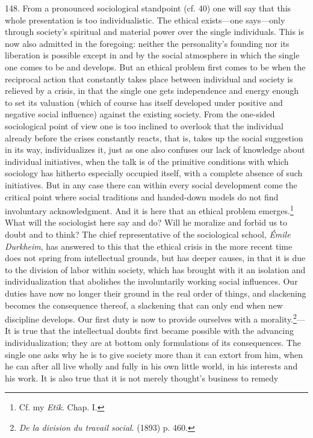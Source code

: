 \documentclass[12pt,a4paper]{book}
\newcommand{\opage}[1]{\marginnote{\footnotesize\textit{[#1]}}}
\begin{document}
148. From a pronounced sociological standpoint (cf. 40) one will say that this whole presentation is too
individualistic. The ethical exists---one says---only through society's spiritual and material power over
the single individuals. This is now also admitted in the foregoing: neither the \opage{354}personality's founding nor
its liberation is possible except in and by the social atmosphere in which the single one comes to be and
develops. But an ethical problem first comes to be when the reciprocal action that constantly takes place
between individual and society is relieved by a crisis, in that the single one gets independence and energy
enough to set its valuation (which of course has itself developed under positive and negative social
influence) against the existing society. From the one-sided sociological point of view one is too inclined
to overlook that the individual already before the crises constantly reacts, that is, takes up the social
suggestion in its way, individualizes it, just as one also confuses our lack of knowledge about individual
initiatives, when the talk is of the primitive conditions with which sociology has hitherto especially
occupied itself, with a complete absence of such initiatives. But in any case there can within every social
development come the critical point where social traditions and handed-down models do not find involuntary
acknowledgment. And it is here that an ethical problem emerges.\footnote{Cf. my \emph{Etik}. Chap. I.} What
will the sociologist here say and do? Will he moralize and forbid us to doubt and to think? The chief
representative of the sociological school, \emph{Émile Durkheim}, has answered to this that the ethical
crisis in the more recent time does not spring from intellectual grounds, but has deeper causes, in that it
is due to the division of labor within society, which has brought with it an isolation and individualization
that abolishes the involuntarily working social influences. Our duties have now no longer their ground in the
real order of things, and slackening becomes the consequence thereof, a slackening that can only end when new
discipline develops. Our first duty is now to provide ourselves with a morality.\footnote{\emph{De la division
du travail social}. (1893) p. 460.}---It is true that the intellectual doubts first became possible with the
advancing individualization; they are at bottom only formulations of its consequences. The single one asks why
he is to give society more than it can extort from \opage{355}him, when he can after all live wholly and fully in his own
little world, in his interests and his work. It is also true that it is not merely thought's business to remedy
\end{document}
